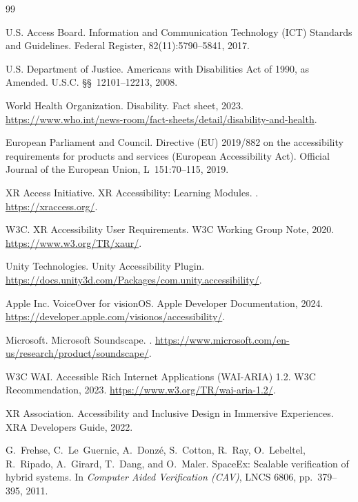 \documentclass[11pt,letterpaper]{article}
\begin{document}

\begin{thebibliography}{99}

U.S. Access Board.
\newblock Information and Communication Technology (ICT) Standards and Guidelines.
\newblock Federal Register, 82(11):5790--5841, 2017.

U.S. Department of Justice.
\newblock Americans with Disabilities Act of 1990, as Amended.
 U.S.C. \S\S~12101--12213, 2008.

World Health Organization.
\newblock Disability.
\newblock Fact sheet, 2023. \url{https://www.who.int/news-room/fact-sheets/detail/disability-and-health}.

European Parliament and Council.
\newblock Directive (EU) 2019/882 on the accessibility requirements for products and services (European Accessibility Act).
\newblock Official Journal of the European Union, L~151:70--115, 2019.

XR Access Initiative.
\newblock XR Accessibility: Learning Modules.
. \url{https://xraccess.org/}.

W3C.
\newblock XR Accessibility User Requirements.
\newblock W3C Working Group Note, 2020. \url{https://www.w3.org/TR/xaur/}.

Unity Technologies.
\newblock Unity Accessibility Plugin.
\newblock \url{https://docs.unity3d.com/Packages/com.unity.accessibility/}.

Apple Inc.
\newblock VoiceOver for visionOS.
\newblock Apple Developer Documentation, 2024. \url{https://developer.apple.com/visionos/accessibility/}.

Microsoft.
\newblock Microsoft Soundscape.
. \url{https://www.microsoft.com/en-us/research/product/soundscape/}.

W3C WAI.
\newblock Accessible Rich Internet Applications (WAI-ARIA) 1.2.
\newblock W3C Recommendation, 2023. \url{https://www.w3.org/TR/wai-aria-1.2/}.

XR Association.
\newblock Accessibility and Inclusive Design in Immersive Experiences.
\newblock XRA Developers Guide, 2022.

G.~Frehse, C.~Le~Guernic, A.~Donz{\'e}, S.~Cotton, R.~Ray, O.~Lebeltel, R.~Ripado, A.~Girard, T.~Dang, and O.~Maler.
\newblock SpaceEx: Scalable verification of hybrid systems.
\newblock In \emph{Computer Aided Verification (CAV)}, LNCS 6806, pp.~379--395, 2011.


\end{thebibliography}
\end{document}

